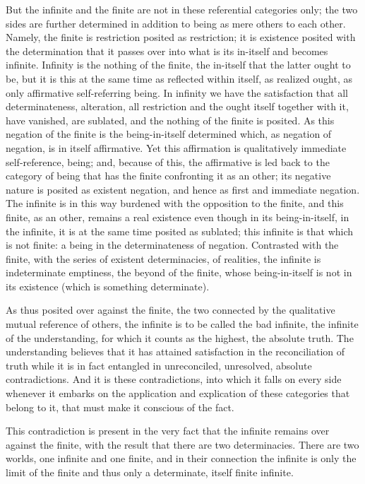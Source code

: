 But the infinite and the finite are not
in these referential categories only;
the two sides are further determined in addition
to being as mere others to each other.
Namely, the finite is restriction posited as restriction;
it is existence posited with the determination
that it passes over into what is its in-itself
and becomes infinite.
Infinity is the nothing of the finite,
the in-itself that the latter ought to be,
but it is this at the same time
as reflected within itself,
as realized ought, as only
affirmative self-referring being.
In infinity we have the satisfaction
that all determinateness, alteration, all restriction
and the ought itself together with it,
have vanished, are sublated,
and the nothing of the finite is posited.
As this negation of the finite is
the being-in-itself determined which,
as negation of negation, is in itself affirmative.
Yet this affirmation is qualitatively
immediate self-reference, being;
and, because of this, the affirmative is led back
to the category of being that has
the finite confronting it as an other;
its negative nature is posited as existent negation,
and hence as first and immediate negation.
The infinite is in this way burdened
with the opposition to the finite,
and this finite, as an other, remains a real existence
even though in its being-in-itself, in the infinite,
it is at the same time posited as sublated;
this infinite is that which is not finite:
a being in the determinateness of negation.
Contrasted with the finite,
with the series of existent determinacies,
of realities,
the infinite is indeterminate emptiness,
the beyond of the finite,
whose being-in-itself is not in its existence
(which is something determinate).

As thus posited over against the finite,
the two connected by the qualitative mutual reference of others,
the infinite is to be called the bad infinite,
the infinite of the understanding,
for which it counts as the highest,
the absolute truth.
The understanding believes that
it has attained satisfaction
in the reconciliation of truth
while it is in fact entangled in
unreconciled, unresolved, absolute contradictions.
And it is these contradictions,
into which it falls on every side whenever
it embarks on the application and explication
of these categories that belong to it,
that must make it conscious of the fact.

This contradiction is present in the very fact
that the infinite remains over against the finite,
with the result that there are two determinacies.
There are two worlds, one infinite and one finite,
and in their connection the infinite is only
the limit of the finite and thus only a determinate,
itself finite infinite.

